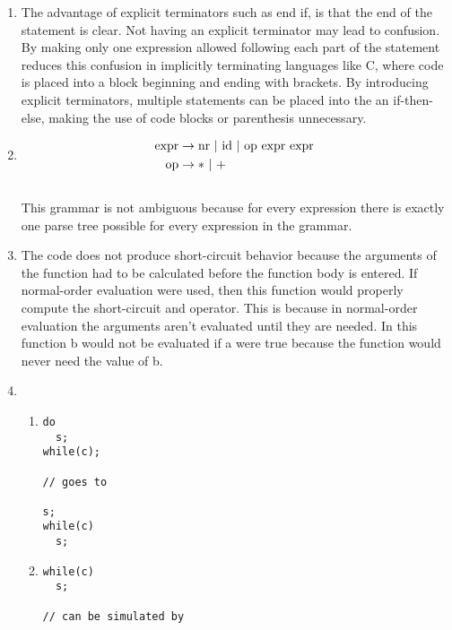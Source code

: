 
\begin{enumerate}

\item
The advantage of explicit terminators such as end if, is that the end of the statement is clear.  Not having an
explicit terminator may lead to confusion.  By making only one expression allowed following each part of the
statement reduces this confusion in implicitly terminating languages like C, where code is placed into a
block beginning and ending with brackets.  By introducing explicit terminators, multiple statements can be placed
into the an if-then-else, making the use of code blocks or parenthesis unnecessary.

\item
\[
\begin{aligned}
\textup{expr} & \rightarrow \textup{nr } | \textup{ id } | \textup{ op expr expr } \\
\textup{op} & \rightarrow  * \textup{ } | \textup{ +}
\end{aligned}
\] \\

This grammar is not ambiguous because for every expression there is exactly one parse tree possible for every
expression in the grammar. \\

\item
The code does not produce short-circuit behavior because the arguments of the function had to be calculated before the function
body is entered.  If normal-order evaluation were used, then this function would properly compute the short-circuit and operator.
This is because in normal-order evaluation the arguments aren't evaluated until they are needed.  In this function b would not be
evaluated if a were true because the function would never need the value of b.

\item
\begin{enumerate}
\item
\begin{verbatim}
do
  s;
while(c);

// goes to

s;
while(c)
  s;

\end{verbatim}

\item
\begin{verbatim}
while(c)
  s;

// can be simulated by


\end{verbatim}
\end{enumerate}
\end{enumerate}
